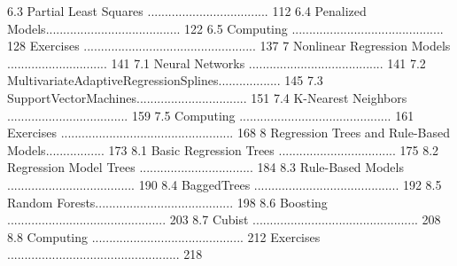 6.3 Partial Least Squares ................................... 112
6.4 Penalized Models....................................... 122
6.5 Computing ............................................ 128
Exercises .................................................. 137
7 Nonlinear Regression Models ............................. 141
7.1 Neural Networks ....................................... 141
7.2 MultivariateAdaptiveRegressionSplines.................. 145
7.3 SupportVectorMachines................................ 151
7.4 K-Nearest Neighbors ................................... 159
7.5 Computing ............................................ 161
Exercises .................................................. 168
8 Regression Trees and Rule-Based Models................. 173
8.1 Basic Regression Trees .................................. 175
8.2 Regression Model Trees ................................. 184
8.3 Rule-Based Models ..................................... 190
8.4 BaggedTrees .......................................... 192
8.5 Random Forests........................................ 198
8.6 Boosting .............................................. 203
8.7 Cubist ................................................ 208
8.8 Computing ............................................ 212
Exercises .................................................. 218

